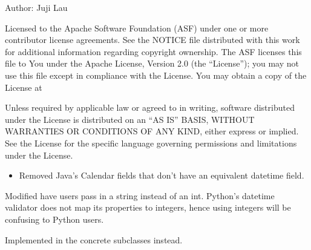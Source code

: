 \documentclass[letterpaper,10pt,english]{sphinxmanual}
\begin{document}
\sphinxAtStartPar
Author: Juji Lau
\begin{description}
\sphinxAtStartPar
Licensed to the Apache Software Foundation (ASF) under one or more
contributor license agreements. See the NOTICE file distributed with
this work for additional information regarding copyright ownership.
The ASF licenses this file to You under the Apache License, Version 2.0
(the “License”); you may not use this file except in compliance with
the License. You may obtain a copy of the License at
\begin{quote}

\sphinxAtStartPar
{}
\end{quote}

\sphinxAtStartPar
Unless required by applicable law or agreed to in writing, software
distributed under the License is distributed on an “AS IS” BASIS,
WITHOUT WARRANTIES OR CONDITIONS OF ANY KIND, either express or implied.
See the License for the specific language governing permissions and
limitations under the License.

\begin{itemize}
\item {} 
\sphinxAtStartPar
Removed Java’s Calendar fields that don’t have an equivalent datetime field.

\end{itemize}

\sphinxAtStartPar
Modified  have users pass in a string
instead of an int. Python’s datetime validator does not map its properties to integers, hence using integers will be confusing
to Python users.

\sphinxAtStartPar
Implemented  in the concrete subclasses instead.

\end{description}
\end{document}
